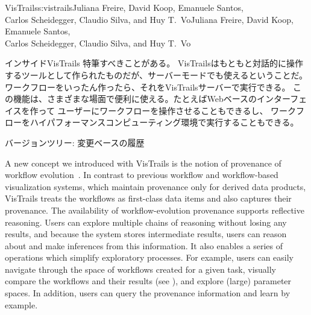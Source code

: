 \begin{aosachaptertoc}{VisTrails}{s:vistrails}{Juliana Freire, David Koop, Emanuele Santos, \\ Carlos Scheidegger, Claudio Silva, and Huy T.\ Vo}{Juliana Freire, David Koop, Emanuele Santos, \\ \hspace*{0.9cm} Carlos Scheidegger, Claudio Silva, and Huy T.\ Vo}
\begin{aosasect1}{インサイドVisTrails}
特筆すべきことがある。
VisTrailsはもともと対話的に操作するツールとして作られたものだが、サーバーモードでも使えるということだ。
ワークフローをいったん作ったら、それをVisTrailsサーバーで実行できる。
この機能は、さまざまな場面で便利に使える。たとえばWebベースのインターフェイスを作って
ユーザーにワークフローを操作させることもできるし、
ワークフローをハイパフォーマンスコンピューティング環境で実行することもできる。

\begin{aosasect2}{バージョンツリー: 変更ベースの履歴}


A new concept we introduced with VisTrails is the notion of provenance
of workflow evolution~\cite{bib:freire:vistrails}. In contrast to previous workflow and 
workflow-based visualization systems, which maintain provenance only
for derived data products, VisTrails treats the workflows as
first-class data items and also captures their provenance. The
availability of workflow-evolution provenance supports reflective
reasoning. Users can explore multiple chains of reasoning without
losing any results, and because the system stores intermediate
results, users can reason about and make inferences from this
information.  It also enables a series of operations which simplify
exploratory processes. For example, users can easily navigate through
the space of workflows created for a given task, visually compare the
workflows and their results (see
), and explore (large) parameter
spaces. In addition, users can query the provenance information and
learn by example.


\end{aosasect2}
\end{aosasect1}
\end{aosachaptertoc}
